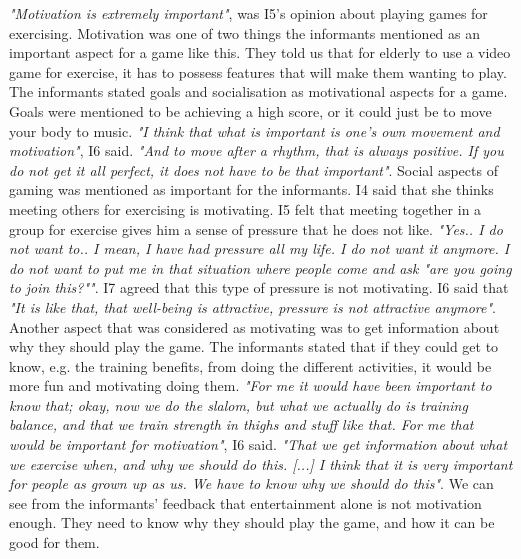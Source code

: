 \emph{"Motivation is extremely important"}, was I5's opinion about playing games for exercising. Motivation was one of two things the informants mentioned as an important aspect for a game like this. They told us that for elderly to use a video game for exercise, it has to possess features that will make them wanting to play. The informants stated goals and socialisation as motivational aspects for a game. Goals were mentioned to be achieving a high score, or it could just be to move your body to music. \emph{"I think that what is important is one's own movement and motivation"}, I6 said. \emph{"And to move after a rhythm, that is always positive. If you do not get it all perfect, it does not have to be that important"}. Social aspects of gaming was mentioned as important for the informants. I4 said that she thinks meeting others for exercising is motivating. I5 felt that meeting together in a group for exercise gives him a sense of pressure that he does not like. \emph{"Yes.. I do not want to.. I mean, I have had pressure all my life. I do not want it anymore. I do not want to put me in that situation where people come and ask "are you going to join this?""}. I7 agreed that this type of pressure is not motivating. I6 said that \emph{"It is like that, that well-being is attractive, pressure is not attractive anymore"}.  Another aspect that was considered as motivating was to get information about why they should play the game. The informants stated that if they could get to know, e.g. the training benefits, from doing the different activities, it would be more fun and motivating doing them. \emph{"For me it would have been important to know that; okay, now we do the slalom, but what we actually do is training balance, and that we train strength in thighs and stuff like that. For me that would be important for motivation"}, I6 said. \emph{"That we get information about what we exercise when, and why we should do this. [...] I think that it is very important for people as grown up as us. We have to know why we should do this"}. We can see from the informants' feedback that entertainment alone is not motivation enough. They need to know why they should play the game, and how it can be good for them. 

